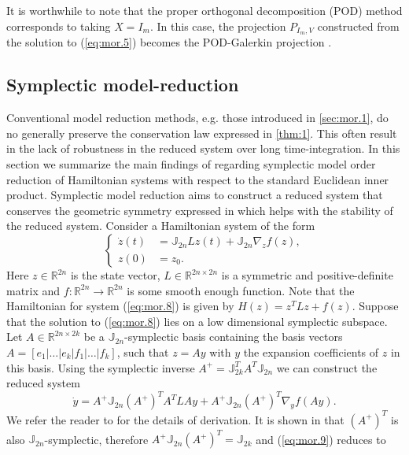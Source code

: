 It is worthwhile to note that the proper orthogonal decomposition (POD) method \cite{hesthaven2015certified} corresponds to taking $X = I_m$. In this case, the projection $P_{I_m,V}$ constructed from the solution to (\ref{eq:mor.5}) becomes the POD-Galerkin projection \cite{hesthaven2015certified}.

\subsection{Symplectic model-reduction} \label{sec:mor.2}
Conventional model reduction methods, e.g. those introduced in \cref{sec:mor.1}, do no generally preserve the conservation law expressed in \cref{thm:1}. This often result in the lack of robustness in the reduced system over long time-integration. In this section we summarize the main findings of \cite{doi:10.1137/17M1111991} regarding symplectic model order reduction of Hamiltonian systems with respect to the standard Euclidean inner product. Symplectic model reduction aims to construct a reduced system that conserves the geometric symmetry expressed in  which helps with the stability of the reduced system.
Consider a Hamiltonian system of the form
\begin{equation} \label{eq:mor.8}
\left\{
\begin{aligned}
	\dot z(t) &= \mathbb J_{2n} L z(t) + \mathbb J_{2n} \nabla_z f(z), \\
	z(0) &= z_0.
\end{aligned}
\right.
\end{equation}
Here $z\in \mathbb R^{2n}$ is the state vector, $L\in\mathbb R^{2n\times 2n}$ is a symmetric and positive-definite matrix and $f:\mathbb R^{2n}\to\mathbb R^{2n}$ is some smooth enough function. Note that the Hamiltonian for system (\ref{eq:mor.8}) is given by $H(z) = z^TLz + f(z)$. Suppose that the solution to (\ref{eq:mor.8}) lies on a low dimensional symplectic subspace. Let $A\in \mathbb{R}^{2n\times 2k}$ be a $\mathbb{J}_{2n}$-symplectic basis containing the basis vectors $A=[e_1|\dots|e_k|f_1|\dots|f_k]$, such that $z = Ay$ with $y$ the expansion coefficients of $z$ in this basis. Using the symplectic inverse $A^+ = \mathbb J_{2k}^T A^T \mathbb J_{2n}$ we can construct the reduced system
\begin{equation} \label{eq:mor.9}
	\dot y = A^+ \mathbb J_{2n} (A^+)^T A^T L A y + A^+ \mathbb J_{2n} (A^+)^T \nabla_y f(Ay).
\end{equation}
We refer the reader to \cite{doi:10.1137/17M1111991} for the details of derivation. It is shown in \cite{doi:10.1137/140978922} that $(A^+)^T$ is also $\mathbb J_{2n}$-symplectic, therefore $A^+ \mathbb J_{2n} (A^+)^T = \mathbb J_{2k}$ and (\ref{eq:mor.9}) reduces to
